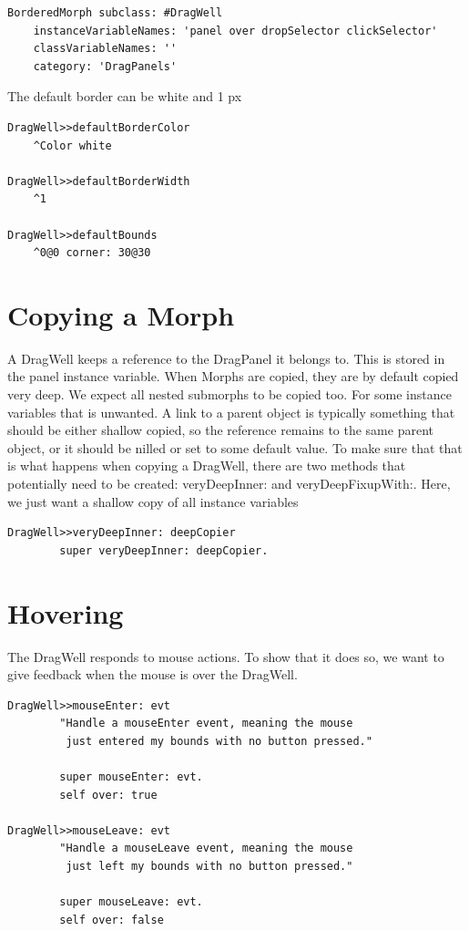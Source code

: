 \documentclass[10pt, twoside]{article}   	%
\begin{document}
\begin{verbatim}
BorderedMorph subclass: #DragWell
    instanceVariableNames: 'panel over dropSelector clickSelector'
    classVariableNames: ''
    category: 'DragPanels'
\end{verbatim} 
The default border can be white and 1 px
\begin{verbatim}
DragWell>>defaultBorderColor
    ^Color white

DragWell>>defaultBorderWidth
    ^1

DragWell>>defaultBounds
    ^0@0 corner: 30@30
\end{verbatim}

\section{Copying a Morph}

A DragWell keeps a reference to the DragPanel it belongs to. This is stored 
in the panel instance variable. When Morphs are copied, they are by default copied very deep.
We expect all nested submorphs to be copied too. For some instance variables that is unwanted.
A link to a parent object is typically something that should be either shallow copied, so the reference 
remains to the same parent object, or it should be nilled or set to some default value. To make sure 
that that is what happens when copying a DragWell, there are two methods that potentially need 
to be created: veryDeepInner: and veryDeepFixupWith:. Here, we just want a shallow copy of 
all instance variables

\begin{verbatim}
DragWell>>veryDeepInner: deepCopier
        super veryDeepInner: deepCopier.
\end{verbatim}	

\section{Hovering}
The DragWell responds to mouse actions. To show that it does so, we want to give feedback
when the mouse is over the DragWell. 

\begin{verbatim}
DragWell>>mouseEnter: evt
        "Handle a mouseEnter event, meaning the mouse 
         just entered my bounds with no button pressed."

        super mouseEnter: evt.
        self over: true

DragWell>>mouseLeave: evt
        "Handle a mouseLeave event, meaning the mouse 
         just left my bounds with no button pressed."

        super mouseLeave: evt.
        self over: false
\end{verbatim}	
\end{document}
